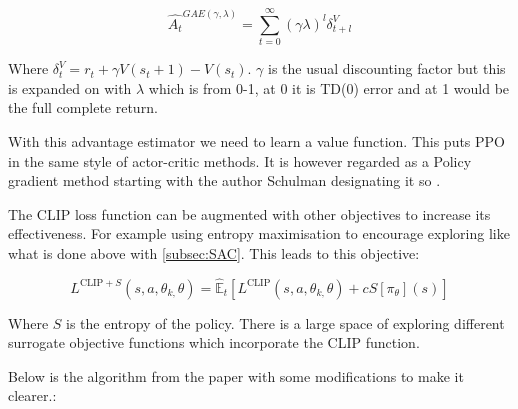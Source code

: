 \begin{equation}
\hat{A_{t}}^{GAE(\gamma, \lambda)} = \sum_{t=0}^{\infty}(\gamma\lambda)^{l}\delta_{t+l}^{V}
\end{equation}

Where $\delta_{t}^{V}=r_{t}+\gamma V(s_{t}+1)-V(s_{t})$. $\gamma$ is the usual discounting factor but this is expanded on with $\lambda$ which is from 0-1, at 0 it is TD(0) error and at 1 would be the full complete return.

With this advantage estimator we need to learn a value function. This puts PPO in the same style of actor-critic methods. It is however regarded as a Policy gradient method starting with the author Schulman designating it so \cite{schulmanProximalPolicyOptimization2017}.

The CLIP loss function can be augmented with other objectives to increase its effectiveness. For example using entropy maximisation to encourage exploring like what is done above with \ref{subsec:SAC}. This leads to this objective:

\begin{equation}
L^{\text{CLIP} + S}(s, a, \theta_{k, }\theta)=\hat{\mathbb{E}}_{t}\left[ L^{\text{CLIP}}(s,a, \theta_{k, }\theta)+cS\left[ \pi_{\theta}\right](s)  \right] 
\end{equation}

Where $S$ is the entropy of the policy. There is a large space of exploring different surrogate objective functions which incorporate the CLIP function.

Below is the algorithm from the paper \cite{schulmanProximalPolicyOptimization2017} with some modifications to make it clearer.:

